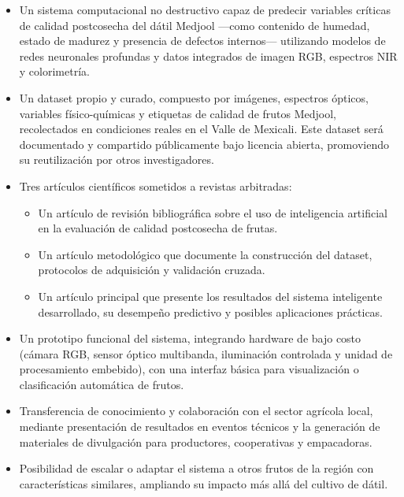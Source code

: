 \begin{itemize}
    \item Un sistema computacional no destructivo capaz de predecir variables críticas de calidad postcosecha del dátil Medjool —como contenido de humedad, estado de madurez y presencia de defectos internos— utilizando modelos de redes neuronales profundas y datos integrados de imagen RGB, espectros NIR y colorimetría.
    \item Un dataset propio y curado, compuesto por imágenes, espectros ópticos, variables físico-químicas y etiquetas de calidad de frutos Medjool, recolectados en condiciones reales en el Valle de Mexicali. Este dataset será documentado y compartido públicamente bajo licencia abierta, promoviendo su reutilización por otros investigadores.
    \item Tres artículos científicos sometidos a revistas arbitradas:
    \begin{itemize}
        \item Un artículo de revisión bibliográfica sobre el uso de inteligencia artificial en la evaluación de calidad postcosecha de frutas.
        \item Un artículo metodológico que documente la construcción del dataset, protocolos de adquisición y validación cruzada.
        \item Un artículo principal que presente los resultados del sistema inteligente desarrollado, su desempeño predictivo y posibles aplicaciones prácticas.
    \end{itemize}
    \item Un prototipo funcional del sistema, integrando hardware de bajo costo (cámara RGB, sensor óptico multibanda, iluminación controlada y unidad de procesamiento embebido), con una interfaz básica para visualización o clasificación automática de frutos.
    \item Transferencia de conocimiento y colaboración con el sector agrícola local, mediante presentación de resultados en eventos técnicos y la generación de materiales de divulgación para productores, cooperativas y empacadoras.
    \item Posibilidad de escalar o adaptar el sistema a otros frutos de la región con características similares, ampliando su impacto más allá del cultivo de dátil.
\end{itemize}
